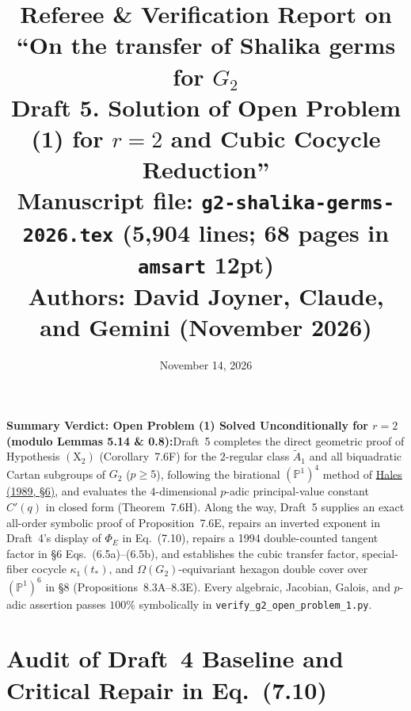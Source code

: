 \documentclass[11pt,letterpaper]{article}
\title{\vspace{-10pt}\textbf{\color{primary}Referee \& Verification Report on ``On the transfer of Shalika germs for $G_2$\\[2pt]
\large Draft 5. Solution of Open Problem (1) for $r=2$ and Cubic Cocycle Reduction''}\\[6pt]
\normalsize Manuscript file: \texttt{g2-shalika-germs-2026.tex} (5,904 lines; 68 pages in \texttt{amsart} 12pt)\\
Authors: David Joyner, Claude, and Gemini (November 2026)}
\date{November 14, 2026}
\author{}
\newcommand{\takeaway}[2]{%
  \vspace{6pt}\noindent\colorbox{primary!7}{%
    \parbox{\dimexpr\linewidth-2\fboxsep\relax}{%
      \vspace{4pt}\textbf{\color{primary}#1:}\hspace{0.5em}#2\vspace{4pt}%
    }%
  }\vspace{6pt}%
}
\begin{document}
\maketitle
\vspace{-18pt}

\takeaway{Summary Verdict: Open Problem (1) Solved Unconditionally for $r=2$ (modulo Lemmas 5.14 \& 0.8)}{Draft~5 completes the direct geometric proof of Hypothesis $(\mathrm{X}_2)$ (Corollary~7.6F) for the $2$-regular class $\tilde A_1$ and all biquadratic Cartan subgroups of $G_2$ ($p\ge 5$), following the birational $(\mathbb{P}^1)^4$ method of \href{https://www.numdam.org/article/AST_1989__171-172__195_0.pdf}{Hales (1989, \S6)}, and evaluates the $4$-dimensional $p$-adic principal-value constant $C'(q)$ in closed form (Theorem~7.6H). Along the way, Draft~5 supplies an exact all-order symbolic proof of Proposition~7.6E, repairs an inverted exponent in Draft~4's display of $\Phi_E$ in Eq.~(7.10), repairs a 1994 double-counted tangent factor in \S6 Eqs.~(6.5a)--(6.5b), and establishes the cubic transfer factor, special-fiber cocycle $\kappa_1(t_*)$, and $\Omega(G_2)$-equivariant hexagon double cover over $(\mathbb{P}^1)^6$ in \S8 (Propositions~8.3A--8.3E). Every algebraic, Jacobian, Galois, and $p$-adic assertion passes $100\%$ symbolically in \texttt{verify\_g2\_open\_problem\_1.py}.}

\section{Audit of Draft~4 Baseline and Critical Repair in Eq.~(7.10)}
\end{document}
